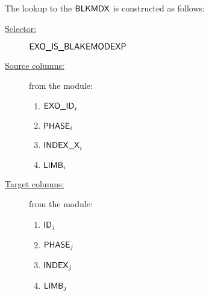 The lookup to the $\textsf{BLKMDX}$ is constructed as follows:
\begin{description}
	\item[\underline{Selector:}] $\textsf{EXO\_IS\_BLAKEMODEXP}$
	\item[\underline{Source columns:}] from the \mmioMod{} module:
		\begin{multicols}{4}
			\begin{enumerate}
				\item $\textsf{EXO\_ID}_{i}$
				\item $\textsf{PHASE}_{i}$
				\item $\textsf{INDEX\_X}_{i}$
				\item $\textsf{LIMB}_{i}$
			\end{enumerate}
		\end{multicols}
	\item[\underline{Target columns:}] from the \blkMdxMod{} module: 
		\begin{multicols}{4}
			\begin{enumerate}
				\item $\textsf{ID}_{j}$
				\item $\textsf{PHASE}_{j}$
				\item $\textsf{INDEX}_{j}$
				\item $\textsf{LIMB}_{j}$
			\end{enumerate}
		\end{multicols}
\end{description}